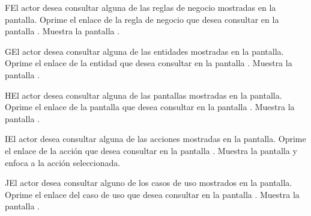  \begin{UCtrayectoriaA}{F}{El actor desea consultar alguna de las reglas de negocio mostradas en la pantalla.}
    \UCpaso[\UCactor] Oprime el enlace de la regla de negocio que desea consultar en la pantalla . \label{cu5.4:consultarReglaNegocio}
	\UCpaso[\UCsist] Muestra la pantalla .
 \end{UCtrayectoriaA}
 \begin{UCtrayectoriaA}{G}{El actor desea consultar alguna de las entidades mostradas en la pantalla.}
    \UCpaso[\UCactor] Oprime el enlace de la entidad que desea consultar en la pantalla . \label{cu5.4:consultarEntidad}
	\UCpaso[\UCsist] Muestra la pantalla .
 \end{UCtrayectoriaA}
 \begin{UCtrayectoriaA}{H}{El actor desea consultar alguna de las pantallas mostradas en la pantalla.}
    \UCpaso[\UCactor] Oprime el enlace de la pantalla que desea consultar en la pantalla . \label{cu5.4:consultarPantalla}
	\UCpaso[\UCsist] Muestra la pantalla .
 \end{UCtrayectoriaA}
 \begin{UCtrayectoriaA}{I}{El actor desea consultar alguna de las acciones mostradas en la pantalla.}
    \UCpaso[\UCactor] Oprime el enlace de la acción que desea consultar en la pantalla . \label{cu5.4:consultarAccion}
	\UCpaso[\UCsist] Muestra la pantalla  y enfoca a la acción seleccionada.
 \end{UCtrayectoriaA}
 \begin{UCtrayectoriaA}{J}{El actor desea consultar alguno de los casos de uso  mostrados en la pantalla.}
    \UCpaso[\UCactor] Oprime el enlace del caso de uso que desea consultar en la pantalla . \label{cu5.4:consultarCasoUso}
	\UCpaso[\UCsist] Muestra la pantalla .
 \end{UCtrayectoriaA}
